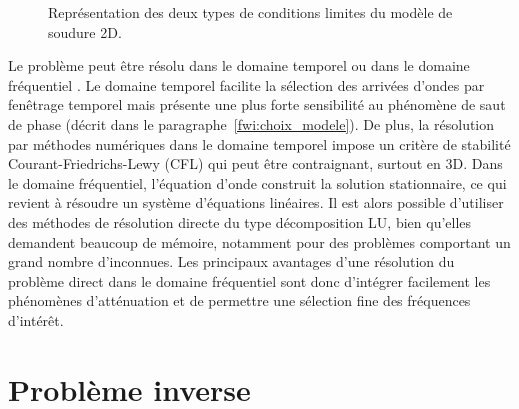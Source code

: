 \begin{figure}[!h]
	\caption{Représentation des deux types de conditions limites du modèle de soudure 2D.\label{BC}}
\end{figure}


Le problème peut être résolu dans le domaine temporel ou dans le domaine fréquentiel \citep{vigh_2008}. Le domaine temporel facilite la sélection des arrivées d'ondes par fenêtrage temporel mais présente une plus forte sensibilité au phénomène de saut de phase (décrit dans le paragraphe~\ref{fwi:choix_modele}).  De plus, la résolution par méthodes numériques dans le domaine temporel impose un critère de stabilité Courant-Friedrichs-Lewy (CFL) qui peut être contraignant, surtout en 3D. Dans le domaine fréquentiel, l'équation d'onde construit la solution stationnaire, ce qui revient à résoudre un système d'équations linéaires. Il est alors possible d'utiliser des méthodes de résolution directe du type décomposition LU, bien qu'elles demandent beaucoup de mémoire, notamment pour des problèmes comportant un grand nombre d'inconnues.  Les principaux avantages d'une résolution du problème direct dans le domaine fréquentiel sont donc d'intégrer facilement les phénomènes d'atténuation et de permettre une sélection fine des fréquences d'intérêt. 







\section{Problème inverse}

